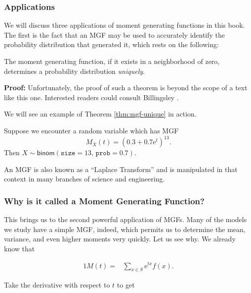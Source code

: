 \documentclass[]{book}
\numberwithin{equation}{chapter}
\numberwithin{figure}{chapter}
\theoremstyle{plain}
\theoremstyle{definition}
\theoremstyle{remark}
\theoremstyle{definition}
\theoremstyle{definition}
\theoremstyle{remark}
\let\BeginKnitrBlock\begin \let\EndKnitrBlock\end
\begin{document}
\subsubsection{Applications}\label{applications}

We will discuss three applications of moment generating functions in
this book. The first is the fact that an MGF may be used to accurately
identify the probability distribution that generated it, which rests on
the following:

\bigskip

\BeginKnitrBlock{theorem}
\protect\hypertarget{thm:mgf-unique}{}{\label{thm:mgf-unique}}The moment
generating function, if it exists in a neighborhood of zero, determines
a probability distribution \emph{uniquely}.
\EndKnitrBlock{theorem}

\textbf{Proof:} Unfortunately, the proof of such a theorem is beyond the
scope of a text like this one. Interested readers could consult
Billingsley \autocite{Billingsley1995}.

We will see an example of Theorem \ref{thm:mgf-unique} in action.

\bigskip

\BeginKnitrBlock{example}
\protect\hypertarget{ex:unnamed-chunk-218}{}{\label{ex:unnamed-chunk-218}}Suppose
we encounter a random variable which has MGF \[
M_{X}(t)=(0.3+0.7\mathrm{e}^{t})^{13}.
\] Then \(X\sim\mathsf{binom}(\mathtt{size}=13,\,\mathtt{prob}=0.7)\).
\EndKnitrBlock{example}

An MGF is also known as a ``Laplace Transform'' and is manipulated in
that context in many branches of science and engineering.

\subsubsection{Why is it called a Moment Generating
Function?}\label{why-is-it-called-a-moment-generating-function}

This brings us to the second powerful application of MGFs. Many of the
models we study have a simple MGF, indeed, which permits us to determine
the mean, variance, and even higher moments very quickly. Let us see
why. We already know that

\begin{alignat*}{1}
M(t)= & \sum_{x\in S}\mathrm{e}^{tx}f(x).
\end{alignat*}

Take the derivative with respect to \(t\) to get
\end{document}
